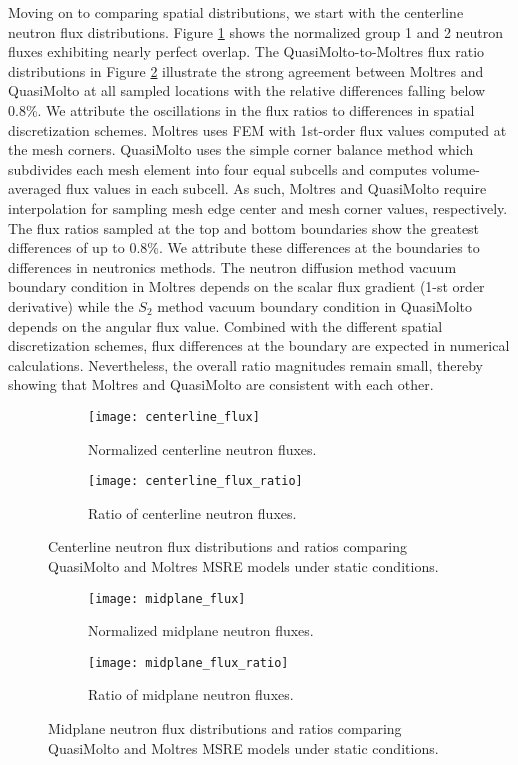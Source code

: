 Moving on to comparing spatial distributions, we start with the centerline neutron flux
distributions. Figure \ref{fig:centerline-flux-dist} shows the normalized group 1 and 2 neutron
fluxes exhibiting nearly perfect overlap. The QuasiMolto-to-Moltres flux ratio distributions in
Figure \ref{fig:centerline-flux-ratio} illustrate the strong agreement between Moltres and
QuasiMolto at all sampled locations with the relative differences falling below 0.8\%. We attribute
the oscillations in the flux ratios to differences in spatial discretization schemes. Moltres
uses \gls{FEM} with 1st-order flux values computed at the mesh corners. QuasiMolto uses
the simple corner balance method which subdivides each mesh element into four equal subcells and
computes volume-averaged flux values in each subcell. As such, Moltres and QuasiMolto require
interpolation for sampling mesh edge center and mesh corner values, respectively. The flux ratios
sampled at the top and bottom boundaries show the greatest differences of up to 0.8\%. We attribute
these differences at the boundaries to differences in neutronics methods. The neutron diffusion
method vacuum boundary condition in Moltres depends on the scalar flux gradient (1-st
order derivative) while the $S_2$ method vacuum boundary condition in QuasiMolto depends on the
angular flux value. Combined with the different spatial discretization schemes, flux differences at
the boundary are expected in numerical calculations. Nevertheless, the overall ratio magnitudes
remain small, thereby showing that Moltres and QuasiMolto are consistent with each other.

\begin{figure}[t]
  \centering
  \begin{subfigure}[b]{0.48\columnwidth}
    \centering
    \texttt{[image: centerline\_flux]}
    \caption{Normalized centerline neutron fluxes.}
    \label{fig:centerline-flux-dist}
  \end{subfigure}
  \hfill
  \begin{subfigure}[b]{0.48\columnwidth}
    \centering
    \texttt{[image: centerline\_flux\_ratio]}
    \caption{Ratio of centerline neutron fluxes.}
    \label{fig:centerline-flux-ratio}
  \end{subfigure}
  \caption{Centerline neutron flux distributions and ratios comparing QuasiMolto and Moltres
  \gls{MSRE} models under static conditions.}
  \label{fig:centerline-flux}
  \begin{subfigure}[b]{0.48\columnwidth}
    \centering
    \texttt{[image: midplane\_flux]}
    \caption{Normalized midplane neutron fluxes.}
    \label{fig:midplane-flux-dist}
  \end{subfigure}
  \hfill
  \begin{subfigure}[b]{0.48\columnwidth}
    \centering
    \texttt{[image: midplane\_flux\_ratio]}
    \caption{Ratio of midplane neutron fluxes.}
    \label{fig:midplane-flux-ratio}
  \end{subfigure}
  \caption{Midplane neutron flux distributions and ratios comparing QuasiMolto and Moltres
  \gls{MSRE} models under static conditions.}
  \label{fig:midplane-flux}
\end{figure}

